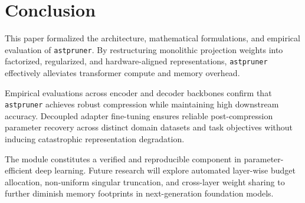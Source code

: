 \section{Conclusion}
This paper formalized the architecture, mathematical formulations, and empirical evaluation of \texttt{astpruner}. By restructuring monolithic projection weights into factorized, regularized, and hardware-aligned representations, \texttt{astpruner} effectively alleviates transformer compute and memory overhead.

Empirical evaluations across encoder and decoder backbones confirm that \texttt{astpruner} achieves robust compression while maintaining high downstream accuracy. Decoupled adapter fine-tuning ensures reliable post-compression parameter recovery across distinct domain datasets and task objectives without inducing catastrophic representation degradation.

The module constitutes a verified and reproducible component in parameter-efficient deep learning. Future research will explore automated layer-wise budget allocation, non-uniform singular truncation, and cross-layer weight sharing to further diminish memory footprints in next-generation foundation models.
